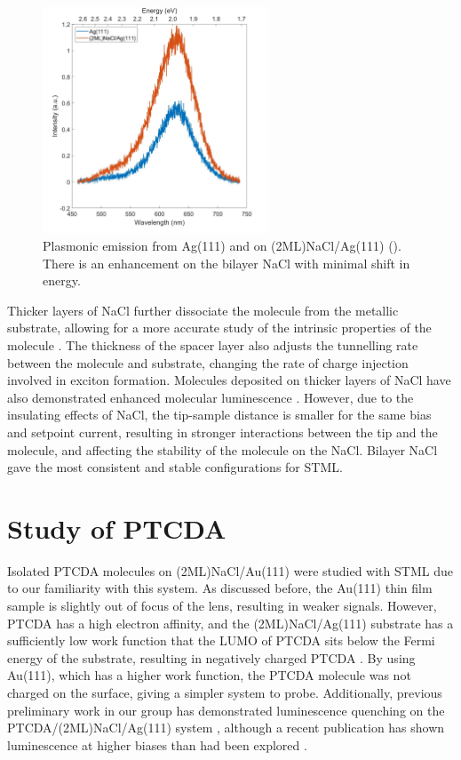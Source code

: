 \begin{figure} [h]
    \centering
    \includegraphics[width=0.6\textwidth]{pictures/NaCl_enhancement_Ag111_275V_250pA_10s.jpg}
    \caption{Plasmonic emission from Ag(111) and on (2ML)NaCl/Ag(111) (). There is an enhancement on the bilayer NaCl with minimal shift in energy. }
    \label{fig:opv:nacl-plasmon}
\end{figure}

Thicker layers of NaCl further dissociate the molecule from the metallic substrate, allowing for a more accurate study of the intrinsic properties of the molecule \citep{repp2005molecules}. The thickness of the spacer layer also adjusts the tunnelling rate between the molecule and substrate, changing the rate of charge injection involved in exciton formation. Molecules deposited on thicker layers of NaCl have also demonstrated enhanced molecular luminescence \citep{Zhang2017,Kroger2018}. However, due to the insulating effects of NaCl, the tip-sample distance is smaller for the same bias and setpoint current, resulting in stronger interactions between the tip and the molecule, and affecting the stability of the molecule on the NaCl. Bilayer NaCl gave the most consistent and stable configurations for \ac{STML}.



\section{Study of PTCDA}

Isolated \ac{PTCDA} molecules on (2ML)NaCl/Au(111) were studied with \ac{STML} due to our familiarity with this system. As discussed before, the Au(111) thin film sample is slightly out of focus of the lens, resulting in weaker signals. However, \ac{PTCDA} has a high electron affinity, and the (2ML)NaCl/Ag(111) substrate has a sufficiently low work function that the \ac{LUMO} of PTCDA sits below the Fermi energy of the substrate, resulting in negatively charged PTCDA \citep{cochrane2017single,cochrane2018molecularly}. By using Au(111), which has a higher work function, the PTCDA molecule was not charged on the surface, giving a simpler system to probe. Additionally, previous preliminary work in our group has demonstrated luminescence quenching on the PTCDA/(2ML)NaCl/Ag(111) system \citep{roussy2016coupling}, although a recent publication has shown luminescence at higher biases than had been explored \citep{Kimura2019}.

